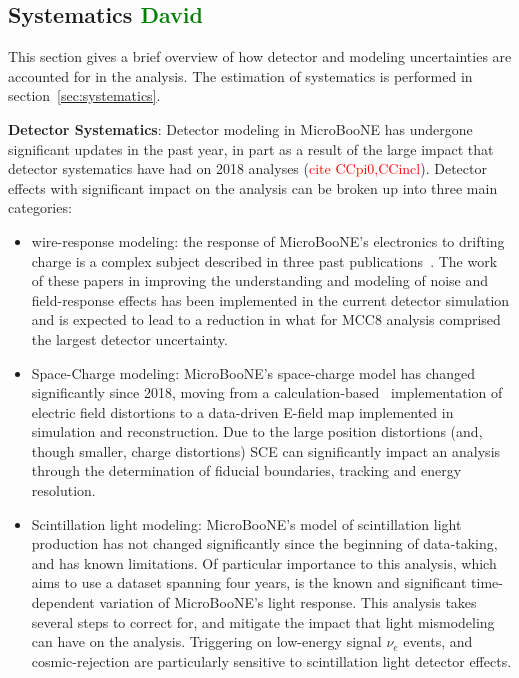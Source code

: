 \documentclass[a4paper]{article}
\begin{document}
\subsection{Systematics \textcolor{green}{David}}
\par This section gives a brief overview of how detector and modeling uncertainties are accounted for in the analysis. The estimation of systematics is performed in section~\ref{sec:systematics}.
\par \noindent \textbf{Detector Systematics}: Detector modeling in MicroBooNE has undergone significant updates in the past year, in part as a result of the large impact that detector systematics have had on 2018 analyses (\textcolor{red}{cite CCpi0,CCincl}). Detector effects with significant impact on the analysis can be broken up into three main categories:
\begin{itemize}
    \item wire-response modeling: the response of MicroBooNE's electronics to drifting charge is a complex subject described in three past publications~\cite{bib:noise,bib:SP1,bib:SP2}. The work of these papers in improving the understanding and modeling of noise and field-response effects has been implemented in the current detector simulation and is expected to lead to a reduction in what for MCC8 analysis comprised the largest detector uncertainty.
    \item Space-Charge modeling: MicroBooNE's space-charge model has changed significantly since 2018, moving from a calculation-based~\cite{bib:SCETN} implementation of electric field distortions to a data-driven E-field map implemented in simulation and reconstruction. Due to the large position distortions (and, though smaller, charge distortions) SCE can significantly impact an analysis through the determination  of fiducial boundaries, tracking and energy resolution.
    \item Scintillation light modeling: MicroBooNE's model of scintillation light production has not changed significantly since the beginning of data-taking, and has known limitations. Of particular importance to this analysis, which aims to use a dataset spanning four years, is the known and significant time-dependent variation of MicroBooNE's light response. This analysis takes several steps to correct for, and mitigate the impact that light mismodeling can have on the analysis. Triggering on low-energy signal $\nu_e$ events, and cosmic-rejection are particularly sensitive to scintillation light detector effects.
\end{itemize}
\end{document}
